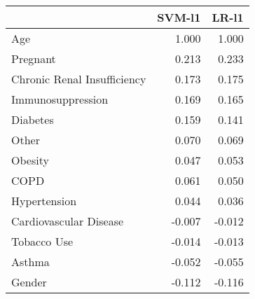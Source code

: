\begin{tabular}{lrr}
\toprule
{} &  SVM-l1 &  LR-l1 \\
\midrule
Age                         &   1.000 &  1.000 \\
Pregnant                    &   0.213 &  0.233 \\
Chronic Renal Insufficiency &   0.173 &  0.175 \\
Immunosuppression           &   0.169 &  0.165 \\
Diabetes                    &   0.159 &  0.141 \\
Other                       &   0.070 &  0.069 \\
Obesity                     &   0.047 &  0.053 \\
COPD                        &   0.061 &  0.050 \\
Hypertension                &   0.044 &  0.036 \\
Cardiovascular Disease      &  -0.007 & -0.012 \\
Tobacco Use                 &  -0.014 & -0.013 \\
Asthma                      &  -0.052 & -0.055 \\
Gender                      &  -0.112 & -0.116 \\
\bottomrule
\end{tabular}
